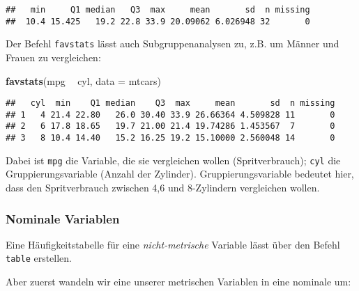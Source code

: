 \documentclass[]{article}
\newenvironment{Shaded}{\begin{snugshade}}{\end{snugshade}}
\newcommand{\DataTypeTok}[1]{\textcolor[rgb]{0.13,0.29,0.53}{#1}}
\newcommand{\DecValTok}[1]{\textcolor[rgb]{0.00,0.00,0.81}{#1}}
\newcommand{\KeywordTok}[1]{\textcolor[rgb]{0.13,0.29,0.53}{\textbf{#1}}}
\newcommand{\NormalTok}[1]{#1}
\newcommand{\OperatorTok}[1]{\textcolor[rgb]{0.81,0.36,0.00}{\textbf{#1}}}
\newcommand{\StringTok}[1]{\textcolor[rgb]{0.31,0.60,0.02}{#1}}
\begin{document}
\begin{Shaded}
\end{Shaded}

\begin{verbatim}
##   min     Q1 median   Q3  max     mean       sd  n missing
##  10.4 15.425   19.2 22.8 33.9 20.09062 6.026948 32       0
\end{verbatim}

Der Befehl \texttt{favstats} lässt auch Subgruppenanalysen zu, z.B. um
Männer und Frauen zu vergleichen:

\begin{Shaded}
\begin{Highlighting}[]
\KeywordTok{favstats}\NormalTok{(mpg }\OperatorTok{~}\StringTok{ }\NormalTok{cyl, }\DataTypeTok{data =}\NormalTok{ mtcars)}
\end{Highlighting}
\end{Shaded}

\begin{verbatim}
##   cyl  min    Q1 median    Q3  max     mean       sd  n missing
## 1   4 21.4 22.80   26.0 30.40 33.9 26.66364 4.509828 11       0
## 2   6 17.8 18.65   19.7 21.00 21.4 19.74286 1.453567  7       0
## 3   8 10.4 14.40   15.2 16.25 19.2 15.10000 2.560048 14       0
\end{verbatim}

Dabei ist \texttt{mpg} die Variable, die sie vergleichen wollen
(Spritverbrauch); \texttt{cyl} die Gruppierungsvariable (Anzahl der
Zylinder). Gruppierungsvariable bedeutet hier, dass den Spritverbrauch
zwischen 4,6 und 8-Zylindern vergleichen wollen.

\hypertarget{nominale-variablen}{%
\subsubsection{Nominale Variablen}\label{nominale-variablen}}

Eine Häufigkeitstabelle für eine \emph{nicht-metrische} Variable lässt
über den Befehl \texttt{table} erstellen.

Aber zuerst wandeln wir eine unserer metrischen Variablen in eine
nominale um:

\begin{Shaded}
\end{Shaded}
\end{document}
